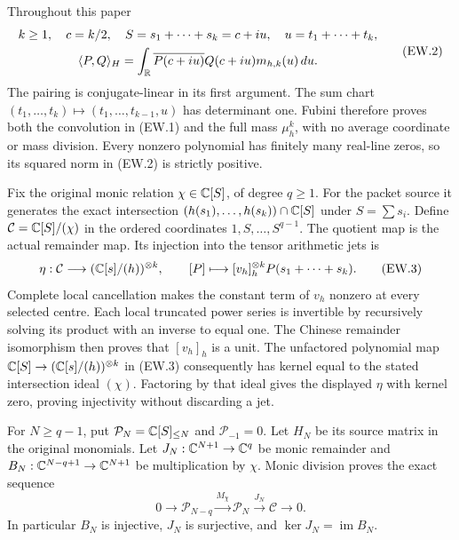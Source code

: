 Throughout this paper
\[
 \begin{gathered}
 k\ge1,\quad c=k/2,\quad S=s_1+\cdots+s_k=c+iu,
 \quad u=t_1+\cdots+t_k,\\
 \langle P,Q\rangle_H=
 \int_{\mathbb{R}}\overline{P(c+iu)}Q(c+iu)m_{h,k}(u)\,du.
 \end{gathered}                                               \tag{EW.2}
\]
The pairing is conjugate-linear in its first argument. The sum chart
$(t_1,\ldots,t_k)\mapsto(t_1,\ldots,t_{k-1},u)$ has determinant
one. Fubini therefore proves both the convolution in (EW.1) and the
full mass $\mu_h^k$, with no average coordinate or mass division.
Every nonzero polynomial has finitely many real-line zeros, so its
squared norm in (EW.2) is strictly positive.

Fix the original monic relation $\chi\in\mathbb{C}[S]$, of degree $q\ge1$.
For the packet source it generates the exact intersection
$(h(s_1),\ldots,h(s_k))\cap\mathbb{C}[S]$ under $S=\sum s_i$.
Define $\mathcal C=\mathbb{C}[S]/(\chi)$ in the ordered coordinates
$1,S,\ldots,S^{q-1}$. The quotient map is the actual remainder
map. Its injection into the tensor arithmetic jets is
\[
 \eta:\mathcal C\longrightarrow(\mathbb{C}[s]/(h))^{\otimes k},
 \qquad [P]\longmapsto[v_h]_h^{\otimes k}P(s_1+\cdots+s_k).
                                                               \tag{EW.3}
\]
Complete local cancellation makes the constant term of $v_h$ nonzero
at every selected centre. Each local truncated power series is
invertible by recursively solving its product with an inverse to
equal one. The Chinese remainder isomorphism then proves that
$[v_h]_h$ is a unit. The unfactored polynomial map
$\mathbb{C}[S]\to(\mathbb{C}[s]/(h))^{\otimes k}$ in (EW.3) consequently has
kernel equal to the stated intersection ideal $(\chi)$. Factoring
by that ideal gives the displayed $\eta$ with kernel zero,
proving injectivity without discarding a jet.

For $N\ge q-1$, put $\mathcal P_N=\mathbb{C}[S]_{\le N}$ and
$\mathcal P_{-1}=0$. Let $H_N$ be its source matrix in the original
monomials. Let $J_N:\mathbb{C}^{N+1}\to\mathbb{C}^q$ be monic remainder
and $B_N:\mathbb{C}^{N-q+1}\to\mathbb{C}^{N+1}$ be multiplication by $\chi$.
Monic division proves the exact sequence
\[
 0\longrightarrow\mathcal P_{N-q}
 \xrightarrow{M_\chi}\mathcal P_N
 \xrightarrow{J_N}\mathcal C\longrightarrow0.                \tag{EW.4}
\]
In particular $B_N$ is injective, $J_N$ is surjective, and
$\ker J_N=\operatorname{im}B_N$.

